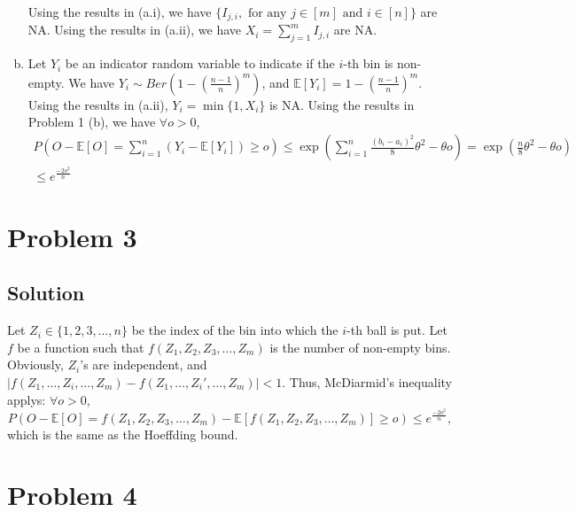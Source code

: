 \documentclass[11pt]{report}
\newcommand{\E}[1]{\mathbb{E}\left[#1\right]}
\begin{document}
\begin{enumerate}[(a)]
  Using the results in (a.i), we have $\{I_{j,i},\text{ for any }j \in [m] \text{ and }i \in [n]\}$ are NA. Using the results in (a.ii), we have $X_i = \sum_{j=1}^{m} I_{j,i}$ are NA.
  \item Let $Y_i$ be an indicator random variable to indicate if the $i$-th bin is non-empty. We have $Y_i \sim Ber(1-(\frac{n-1}{n})^m)$, and $\E{Y_i} = 1-(\frac{n-1}{n})^m$. Using the results in (a.ii), $Y_i = \min\{1, X_i\}$ is NA. Using the results in Problem 1 (b), we have $\forall o > 0$,
  \begin{multline*}
    P\left(O-\E{O} = \sum_{i=1}^{n} (Y_i - \E{Y_i}) \geq o \right) \leq \exp\left(\sum_{i=1}^{n} \frac{(b_i-a_i)^2}{8}\theta^2 - \theta o \right) = \exp\left(\frac{n}{8} \theta^2 - \theta o \right)\\ \leq e^{\frac{-2 o^2}{n}}
  \end{multline*}
\end{enumerate}
\section*{Problem 3}
\subsection*{Solution}
Let $Z_i \in \{1,2,3, \dots, n\}$ be the index of the bin into which the $i$-th ball is put. Let $f$ be a function such that $f(Z_1, Z_2, Z_3, \dots, Z_m)$ is the number of non-empty bins. Obviously, $Z_i$'s are independent, and $\left|f(Z_1, \dots, Z_i, \dots, Z_m) - f(Z_1, \dots, Z_i', \dots, Z_m)\right| < 1$. Thus, McDiarmid's inequality applys: $\forall o > 0$,
\[
  P(O-\E{O} = f(Z_1, Z_2, Z_3, \dots, Z_m) - \E{f(Z_1, Z_2, Z_3, \dots, Z_m)} \geq o) \leq e^\frac{-2 o^2}{n},
\]
which is the same as the Hoeffding bound.
\section*{Problem 4}
\end{document}
